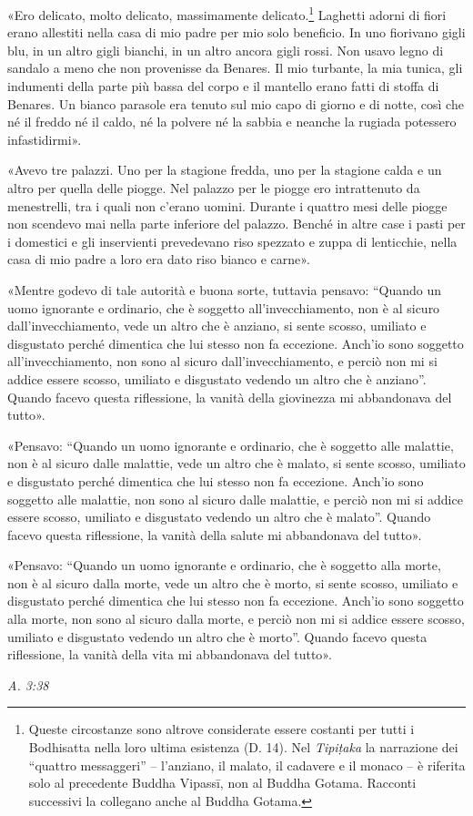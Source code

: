  «Ero delicato, molto delicato, massimamente
delicato.\footnote{Queste circostanze sono altrove considerate essere costanti per tutti i Bodhisatta nella loro ultima esistenza (D. 14). Nel \emph{Tipiṭaka} la narrazione dei “quattro messaggeri” – l’anziano, il malato, il cadavere e il monaco – è riferita solo al precedente Buddha Vipassī, non al Buddha Gotama. Racconti successivi la collegano anche al Buddha Gotama.} Laghetti adorni di fiori erano allestiti
nella casa di mio padre per mio solo beneficio. In uno fiorivano gigli
blu, in un altro gigli bianchi, in un altro ancora gigli rossi. Non
usavo legno di sandalo a meno che non provenisse da Benares. Il mio
turbante, la mia tunica, gli indumenti della parte più bassa del corpo e
il mantello erano fatti di stoffa di Benares. Un bianco parasole era
tenuto sul mio capo di giorno e di notte, così che né il freddo né il
caldo, né la polvere né la sabbia e neanche la rugiada potessero
infastidirmi».


«Avevo tre palazzi. Uno per la stagione fredda, uno per la stagione
calda e un altro per quella delle piogge. Nel palazzo per le piogge ero
intrattenuto da menestrelli, tra i quali non c’erano uomini. Durante i
quattro mesi delle piogge non scendevo mai nella parte inferiore del
palazzo. Benché in altre case i pasti per i domestici e gli inservienti
prevedevano riso spezzato e zuppa di lenticchie, nella casa di mio padre
a loro era dato riso bianco e carne».


«Mentre godevo di tale autorità e buona sorte, tuttavia pensavo: “Quando
un uomo ignorante e ordinario, che è soggetto all’invecchiamento, non è
al sicuro dall’invecchiamento, vede un altro che è anziano, si sente
scosso, umiliato e disgustato perché dimentica che lui stesso non fa
eccezione. Anch’io sono soggetto all’invecchiamento, non sono al sicuro
dall’invecchiamento, e perciò non mi si addice essere scosso, umiliato e
disgustato vedendo un altro che è anziano”. Quando facevo questa
riflessione, la vanità della giovinezza mi abbandonava del tutto».


«Pensavo: “Quando un uomo ignorante e ordinario, che è soggetto alle
malattie, non è al sicuro dalle malattie, vede un altro che è malato, si
sente scosso, umiliato e disgustato perché dimentica che lui stesso non
fa eccezione. Anch’io sono soggetto alle malattie, non sono al sicuro
dalle malattie, e perciò non mi si addice essere scosso, umiliato e
disgustato vedendo un altro che è malato”. Quando facevo questa
riflessione, la vanità della salute mi abbandonava del tutto».


«Pensavo: “Quando un uomo ignorante e ordinario, che è soggetto alla
morte, non è al sicuro dalla morte, vede un altro che è morto, si sente
scosso, umiliato e disgustato perché dimentica che lui stesso non fa
eccezione. Anch’io sono soggetto alla morte, non sono al sicuro dalla
morte, e perciò non mi si addice essere scosso, umiliato e disgustato
vedendo un altro che è morto”. Quando facevo questa riflessione, la
vanità della vita mi abbandonava del tutto».


\emph{A. 3:38}


